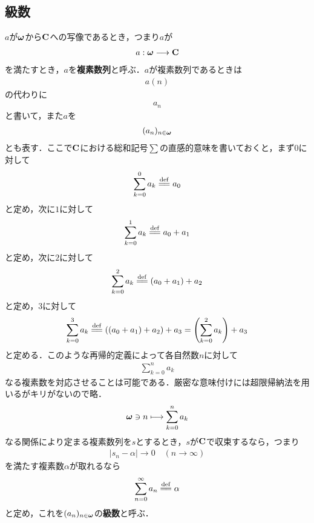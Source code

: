 \subsection{級数}
	
	$a$が${\boldsymbol \omega}$から$\mathbf{C}$への写像であるとき，つまり$a$が
	\begin{align}
		a: {\boldsymbol \omega} \longrightarrow \mathbf{C}
	\end{align}
	を満たすとき，$a$を{\bf 複素数列}と呼ぶ．$a$が複素数列であるときは
	\begin{align}
		a(n)
	\end{align}
	の代わりに
	\begin{align}
		a_n
	\end{align}
	と書いて，また$a$を
	\begin{align}
		(a_n)_{n \in {\boldsymbol \omega}}
	\end{align}
	とも表す．ここで$\mathbf{C}$における総和記号$\sum$の直感的意味を書いておくと，まず$0$に対して
	\begin{align}
		\sum_{k=0}^0 a_k \defeq a_0
	\end{align}
	と定め，次に$1$に対して
	\begin{align}
		\sum_{k=0}^1 a_k \defeq a_0 + a_1
	\end{align}
	と定め，次に$2$に対して
	\begin{align}
		\sum_{k=0}^2 a_k \defeq (a_0 + a_1) + a_2
	\end{align}
	と定め，$3$に対して
	\begin{align}
		\sum_{k=0}^3 a_k \defeq ((a_0 + a_1) + a_2) + a_3 = \left(\sum_{k=0}^2 a_k\right) + a_3
	\end{align}
	と定める．このような再帰的定義によって各自然数$n$に対して
	\begin{align}
		\sum_{k=0}^n a_k
	\end{align}
	なる複素数を対応させることは可能である．厳密な意味付けには超限帰納法を用いるがキリがないので略．
	\begin{align}
		{\boldsymbol \omega} \ni n \longmapsto \sum_{k=0}^n a_k
	\end{align}
	なる関係により定まる複素数列を$s$とするとき，$s$が$\mathbf{C}$で収束するなら，つまり
	\begin{align}
		|s_n - \alpha| \longrightarrow 0\quad (n \longrightarrow \infty)
	\end{align}
	を満たす複素数$\alpha$が取れるなら
	\begin{align}
		\sum_{n=0}^\infty a_n \defeq \alpha
	\end{align}
	と定め，これを$(a_n)_{n \in {\boldsymbol \omega}}$の{\bf 級数}と呼ぶ．
